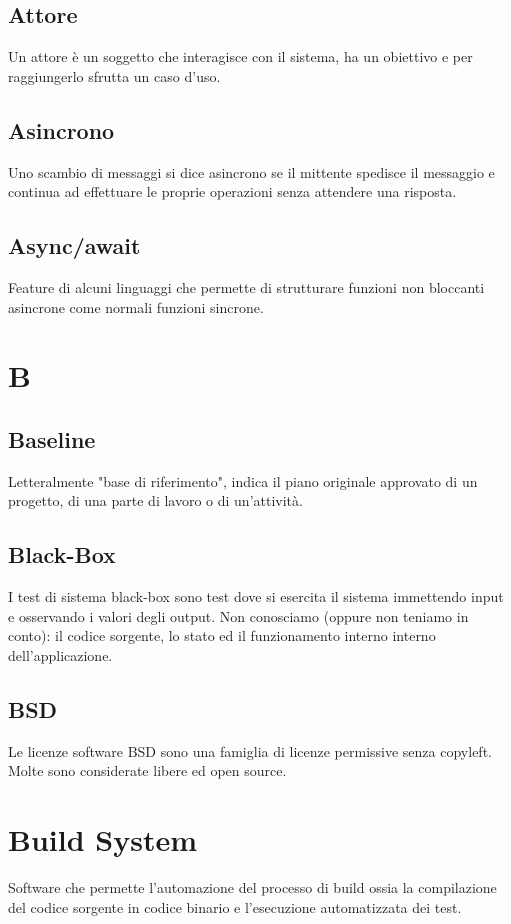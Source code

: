 \subsection*{Attore}
Un attore è un soggetto che interagisce con il sistema, ha un obiettivo e per raggiungerlo sfrutta un caso d'uso\glo. 

\subsection*{Asincrono}
Uno scambio di messaggi si dice asincrono se il mittente spedisce il messaggio e continua ad effettuare le proprie operazioni senza attendere una risposta.

\subsection*{Async/await}
Feature di alcuni linguaggi che permette di strutturare funzioni non bloccanti asincrone come normali funzioni sincrone.

\clearpage
\section*{B}

\subsection*{Baseline}
Letteralmente "base di riferimento", indica il piano originale approvato di un progetto, di una parte di lavoro o di un'attività.

\subsection*{Black-Box}
I test di sistema black-box sono test dove si esercita il sistema immettendo input e osservando i valori degli output.
Non conosciamo (oppure non teniamo in conto): il codice sorgente, lo stato ed il funzionamento interno interno dell’applicazione.

\subsection*{BSD}
Le licenze software BSD sono una famiglia di licenze permissive senza copyleft. Molte sono considerate libere ed open source.

\section{Build System}
Software che permette l'automazione del processo di build ossia la compilazione del codice sorgente in codice binario e l'esecuzione automatizzata dei test. 

